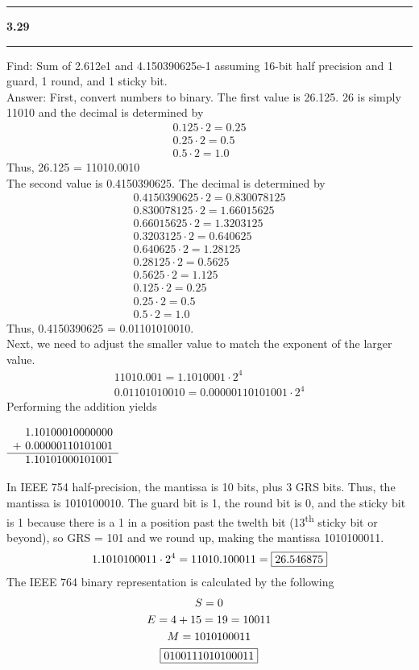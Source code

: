 \documentclass[11pt]{article}
\newcommand\question[2]{\vspace{.25in}\hrule\textbf{#1 #2}\vspace{.5em}\hrule\vspace{.10in}}
\newenvironment{centermath}
 {\begin{center}$\displaystyle}
 {$\end{center}}
\begin{document}
\question{3.29}{}
Find: Sum of 2.612e1 and 4.150390625e-1 assuming 16-bit half precision and 1 guard, 1 round, and 1 sticky bit. \\
\vspace{5mm}
Answer: First, convert numbers to binary. The first value is 26.125. 26 is simply 11010 and the decimal is determined by
\begin{gather*}
0.125 \cdot 2 = 0.25 \\
0.25 \cdot 2 = 0.5 \\
0.5 \cdot 2 = 1.0
\end{gather*}
Thus, 26.125 = 11010.0010 \\
\vspace{5mm}
The second value is 0.4150390625. The decimal is determined by
\begin{gather*}
0.4150390625 \cdot 2 = 0.830078125 \\
0.830078125 \cdot 2 = 1.66015625 \\
0.66015625 \cdot 2 = 1.3203125 \\
0.3203125 \cdot 2 = 0.640625 \\
0.640625 \cdot 2 = 1.28125 \\
0.28125 \cdot 2 = 0.5625 \\
0.5625 \cdot 2 = 1.125 \\
0.125 \cdot 2 = 0.25 \\
0.25 \cdot 2 = 0.5 \\
0.5 \cdot 2 = 1.0
\end{gather*}
Thus, 0.4150390625 = 0.01101010010. \\
\vspace{5mm}
Next, we need to adjust the smaller value to match the exponent of the larger value.
\begin{gather*}
11010.001 = 1.1010001 \cdot 2^4 \\
 0.01101010010 = 0.00000110101001 \cdot 2^4
\end{gather*}
Performing the addition yields
\begin{centermath}
\begin{array}[t]{r}
      1.10100010000000 \\
+ \ 0.00000110101001 \\ \hline
      1.10101000101001
\end{array} 
\end{centermath}
In IEEE 754 half-precision, the mantissa is 10 bits, plus 3 GRS bits. Thus, the mantissa is 1010100010. The guard bit is 1, the round bit is 0, and the sticky bit is 1 because there is a 1 in a position past the twelth bit (13\textsuperscript{th} sticky bit or beyond), so GRS = 101 and we round up, making the mantissa 1010100011.
\begin{gather*}
1.1010100011 \cdot 2^4 = 11010.100011 = \fbox{26.546875}
\end{gather*}
The IEEE 764 binary representation is calculated by the following
\begin{gather*}
S = 0 \\
E = 4 + 15 = 19 = 10011 \\
M = 1010100011 \\
\fbox{0100111010100011}
\end{gather*}
\end{document}
